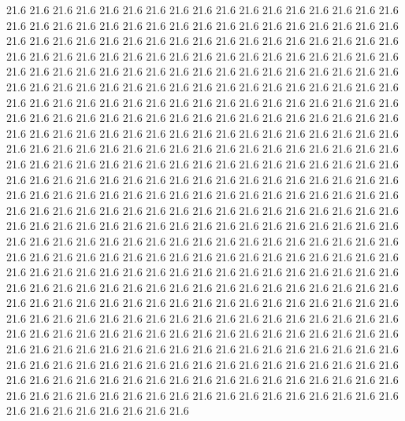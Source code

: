 21.6
21.6
21.6
21.6
21.6
21.6
21.6
21.6
21.6
21.6
21.6
21.6
21.6
21.6
21.6
21.6
21.6
21.6
21.6
21.6
21.6
21.6
21.6
21.6
21.6
21.6
21.6
21.6
21.6
21.6
21.6
21.6
21.6
21.6
21.6
21.6
21.6
21.6
21.6
21.6
21.6
21.6
21.6
21.6
21.6
21.6
21.6
21.6
21.6
21.6
21.6
21.6
21.6
21.6
21.6
21.6
21.6
21.6
21.6
21.6
21.6
21.6
21.6
21.6
21.6
21.6
21.6
21.6
21.6
21.6
21.6
21.6
21.6
21.6
21.6
21.6
21.6
21.6
21.6
21.6
21.6
21.6
21.6
21.6
21.6
21.6
21.6
21.6
21.6
21.6
21.6
21.6
21.6
21.6
21.6
21.6
21.6
21.6
21.6
21.6
21.6
21.6
21.6
21.6
21.6
21.6
21.6
21.6
21.6
21.6
21.6
21.6
21.6
21.6
21.6
21.6
21.6
21.6
21.6
21.6
21.6
21.6
21.6
21.6
21.6
21.6
21.6
21.6
21.6
21.6
21.6
21.6
21.6
21.6
21.6
21.6
21.6
21.6
21.6
21.6
21.6
21.6
21.6
21.6
21.6
21.6
21.6
21.6
21.6
21.6
21.6
21.6
21.6
21.6
21.6
21.6
21.6
21.6
21.6
21.6
21.6
21.6
21.6
21.6
21.6
21.6
21.6
21.6
21.6
21.6
21.6
21.6
21.6
21.6
21.6
21.6
21.6
21.6
21.6
21.6
21.6
21.6
21.6
21.6
21.6
21.6
21.6
21.6
21.6
21.6
21.6
21.6
21.6
21.6
21.6
21.6
21.6
21.6
21.6
21.6
21.6
21.6
21.6
21.6
21.6
21.6
21.6
21.6
21.6
21.6
21.6
21.6
21.6
21.6
21.6
21.6
21.6
21.6
21.6
21.6
21.6
21.6
21.6
21.6
21.6
21.6
21.6
21.6
21.6
21.6
21.6
21.6
21.6
21.6
21.6
21.6
21.6
21.6
21.6
21.6
21.6
21.6
21.6
21.6
21.6
21.6
21.6
21.6
21.6
21.6
21.6
21.6
21.6
21.6
21.6
21.6
21.6
21.6
21.6
21.6
21.6
21.6
21.6
21.6
21.6
21.6
21.6
21.6
21.6
21.6
21.6
21.6
21.6
21.6
21.6
21.6
21.6
21.6
21.6
21.6
21.6
21.6
21.6
21.6
21.6
21.6
21.6
21.6
21.6
21.6
21.6
21.6
21.6
21.6
21.6
21.6
21.6
21.6
21.6
21.6
21.6
21.6
21.6
21.6
21.6
21.6
21.6
21.6
21.6
21.6
21.6
21.6
21.6
21.6
21.6
21.6
21.6
21.6
21.6
21.6
21.6
21.6
21.6
21.6
21.6
21.6
21.6
21.6
21.6
21.6
21.6
21.6
21.6
21.6
21.6
21.6
21.6
21.6
21.6
21.6
21.6
21.6
21.6
21.6
21.6
21.6
21.6
21.6
21.6
21.6
21.6
21.6
21.6
21.6
21.6
21.6
21.6
21.6
21.6
21.6
21.6
21.6
21.6
21.6
21.6
21.6
21.6
21.6
21.6
21.6
21.6
21.6
21.6
21.6
21.6
21.6
21.6
21.6
21.6
21.6
21.6
21.6
21.6
21.6
21.6
21.6
21.6
21.6
21.6
21.6
21.6
21.6
21.6
21.6
21.6
21.6
21.6
21.6
21.6
21.6
21.6
21.6
21.6
21.6
21.6
21.6
21.6
21.6
21.6
21.6
21.6
21.6
21.6
21.6
21.6
21.6
21.6
21.6
21.6
21.6
21.6
21.6
21.6
21.6
21.6
21.6
21.6
21.6
21.6
21.6
21.6
21.6
21.6
21.6
21.6
21.6
21.6
21.6
21.6
21.6
21.6
21.6
21.6
21.6
21.6
21.6
21.6
21.6
21.6
21.6
